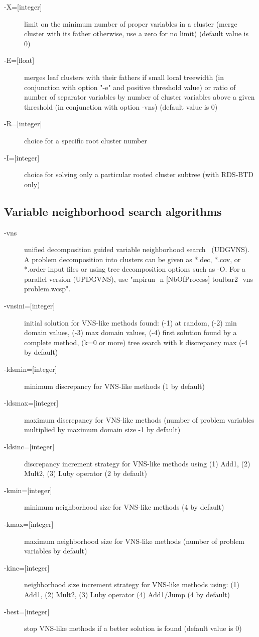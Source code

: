 \documentclass{article}
\begin{document}
\begin{description}
\item[{-X=[integer]}] limit on the minimum number of proper variables in a cluster (merge cluster with its father otherwise, use a zero for no limit) (default value is 0)
\item[{-E=[float]}] merges leaf clusters with their fathers if small local treewidth (in conjunction with option "-e" and positive threshold value) or ratio of number of separator variables by number of cluster variables above a given threshold (in conjunction with option -vns) (default value is 0)
\item[{-R=[integer]}] choice for a specific root cluster number
\item[{-I=[integer]}] choice for solving only a particular rooted cluster subtree (with RDS-BTD only)
 \end{description}

\subsection{Variable neighborhood search algorithms}

\begin{description}
\item[{-vns}] unified decomposition guided variable neighborhood search~\cite{Ouali17} (UDGVNS). A problem decomposition into clusters can be given as *.dec, *.cov, or *.order input files or using tree decomposition options such as -O. For a parallel version (UPDGVNS), use "mpirun -n [NbOfProcess] toulbar2 -vns problem.wcsp".
\item[{-vnsini=[integer]}] initial solution for VNS-like methods found: (-1) at random, (-2) min domain values, (-3) max domain values, (-4) first solution found by a complete method, (k=0 or more) tree search with k discrepancy max (-4 by default)
\item[{-ldsmin=[integer]}] minimum discrepancy for VNS-like methods (1 by default)
\item[{-ldsmax=[integer]}] maximum discrepancy for VNS-like methods (number of problem variables multiplied by maximum domain size -1 by default)
\item[{-ldsinc=[integer]}] discrepancy increment strategy for VNS-like methods using (1) Add1, (2) Mult2, (3) Luby operator (2 by default)
\item[{-kmin=[integer]}] minimum neighborhood size for VNS-like methods (4 by default)
\item[{-kmax=[integer]}] maximum neighborhood size for VNS-like methods (number of problem variables by default)
\item[{-kinc=[integer]}] neighborhood size increment strategy for VNS-like methods using: (1) Add1, (2) Mult2, (3) Luby operator (4) Add1/Jump (4 by default)
\item[{-best=[integer]}] stop VNS-like methods if a better solution is found (default value is 0)
\end{description}
\end{document}

